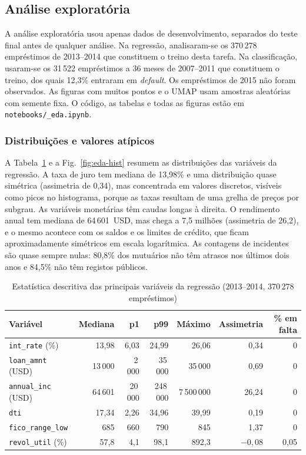 \subsection{Análise exploratória}
\label{sec:eda}

A análise exploratória usou apenas dados de desenvolvimento, separados do teste final antes de qualquer análise. Na regressão, analisaram-se os 370\,278 empréstimos de 2013--2014 que constituem o treino desta tarefa. Na classificação, usaram-se os 31\,522 empréstimos a 36 meses de 2007--2011 que constituem o treino, dos quais 12,3\% entraram em \textit{default}. Os empréstimos de 2015 não foram observados. As figuras com muitos pontos e o UMAP usam amostras aleatórias com semente fixa. O código, as tabelas e todas as figuras estão em \texttt{notebooks/\_eda.ipynb}.

\subsubsection{Distribuições e valores atípicos}

A Tabela~\ref{tab:eda-descritiva} e a Fig.~\ref{fig:eda-hist} resumem as distribuições das variáveis da regressão. A taxa de juro tem mediana de 13,98\% e uma distribuição quase simétrica (assimetria de 0,34), mas concentrada em valores discretos, visíveis como picos no histograma, porque as taxas resultam de uma grelha de preços por subgrau. As variáveis monetárias têm caudas longas à direita. O rendimento anual tem mediana de 64\,601~USD, mas chega a 7,5 milhões (assimetria de 26,2), e o mesmo acontece com os saldos e os limites de crédito, que ficam aproximadamente simétricos em escala logarítmica. As contagens de incidentes são quase sempre nulas: 80,8\% dos mutuários não têm atrasos nos últimos dois anos e 84,5\% não têm registos públicos.

\begin{table}[!t]
\caption{Estatística descritiva das principais variáveis da regressão (2013--2014, 370\,278 empréstimos)}
\label{tab:eda-descritiva}
\centering
\footnotesize
\begin{tabular}{|l|r|r|r|r|r|r|}
\hline
\textbf{Variável} & \textbf{Mediana} & \textbf{p1} & \textbf{p99} & \textbf{Máximo} &
\textbf{Assimetria} & \textbf{\% em falta} \\
\hline
\texttt{int\_rate} (\%)    & 13,98     & 6,03     & 24,99     & 26,06         & 0,34    & 0    \\
\texttt{loan\_amnt} (USD)  & 13\,000   & 2\,000   & 35\,000   & 35\,000       & 0,69    & 0    \\
\texttt{annual\_inc} (USD) & 64\,601   & 20\,000  & 248\,000  & 7\,500\,000   & 26,24   & 0    \\
\texttt{dti}               & 17,34     & 2,26     & 34,96     & 39,99         & 0,19    & 0    \\
\texttt{fico\_range\_low}  & 685       & 660      & 790       & 845           & 1,37    & 0    \\
\texttt{revol\_util} (\%)  & 57,8      & 4,1      & 98,1      & 892,3         & $-0{,}08$ & 0,05 \\
\hline
\end{tabular}
\end{table}

